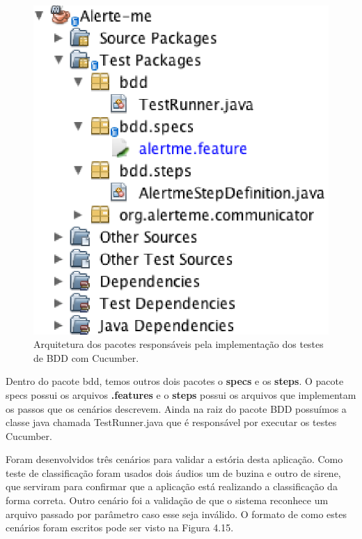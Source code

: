 \begin{figure}[H]
	\centering
	\captionsetup{justification=centering,margin=2cm}
	\includegraphics[scale=0.65]{capitulos/validacao/figuras/arquiteturaDeBddComCucumber.eps}
	\caption{Arquitetura dos pacotes responsáveis pela implementação dos testes de BDD com Cucumber.}
	\label{fig:result-engajamento}
\end{figure}

Dentro do pacote bdd, temos outros dois pacotes o \textbf{specs} e os \textbf{steps}. O pacote specs possui os arquivos \textbf{.features} e o \textbf{steps} possui os arquivos que implementam os passos que os cenários descrevem. Ainda na raiz do pacote BDD possuímos a classe java chamada TestRunner.java que é responsável por executar os testes Cucumber.

Foram desenvolvidos três cenários para validar a estória desta aplicação. Como teste de classificação foram usados dois áudios um de buzina e outro de sirene, que serviram para confirmar que a aplicação está realizando a classificação da forma correta. Outro cenário foi a validação de que o sistema reconhece um arquivo passado por parâmetro caso esse seja inválido. O formato de como estes cenários foram escritos pode ser visto na Figura 4.15.


